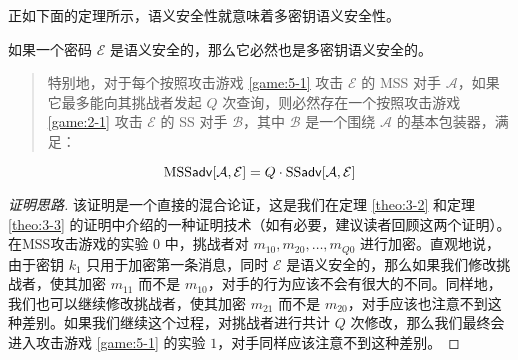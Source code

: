 正如下面的定理所示，语义安全性就意味着多密钥语义安全性。

\begin{theorem}\label{theo:5-1}
如果一个密码 $\mathcal{E}$ 是语义安全的，那么它必然也是多密钥语义安全的。
\begin{quote}
特别地，对于每个按照攻击游戏 \ref{game:5-1} 攻击 $\mathcal{E}$ 的 MSS 对手 $\mathcal{A}$，如果它最多能向其挑战者发起 $Q$ 次查询，则必然存在一个按照攻击游戏 \ref{game:2-1} 攻击 $\mathcal{E}$ 的 SS 对手 $\mathcal{B}$，其中 $\mathcal{B}$ 是一个围绕 $\mathcal{A}$ 的基本包装器，满足：
\end{quote}
\[
{\rm MSS}\mathsf{adv}[\mathcal{A},\mathcal{E}]= Q\cdot{\rm SS\mathsf{adv}}[\mathcal{A},\mathcal{E}]
\]
\end{theorem}

\begin{proof}[证明思路]
该证明是一个直接的混合论证，这是我们在定理 \ref{theo:3-2} 和定理 \ref{theo:3-3} 的证明中介绍的一种证明技术（如有必要，建议读者回顾这两个证明）。在MSS攻击游戏的实验 $0$ 中，挑战者对 $m_{10},m_{20},\dots,m_{Q0}$ 进行加密。直观地说，由于密钥 $k_1$ 只用于加密第一条消息，同时 $\mathcal{E}$ 是语义安全的，那么如果我们修改挑战者，使其加密 $m_{11}$ 而不是 $m_{10}$，对手的行为应该不会有很大的不同。同样地，我们也可以继续修改挑战者，使其加密 $m_{21}$ 而不是 $m_{20}$，对手应该也注意不到这种差别。如果我们继续这个过程，对挑战者进行共计 $Q$ 次修改，那么我们最终会进入攻击游戏 \ref{game:5-1} 的实验 $1$，对手同样应该注意不到这种差别。
\end{proof}

